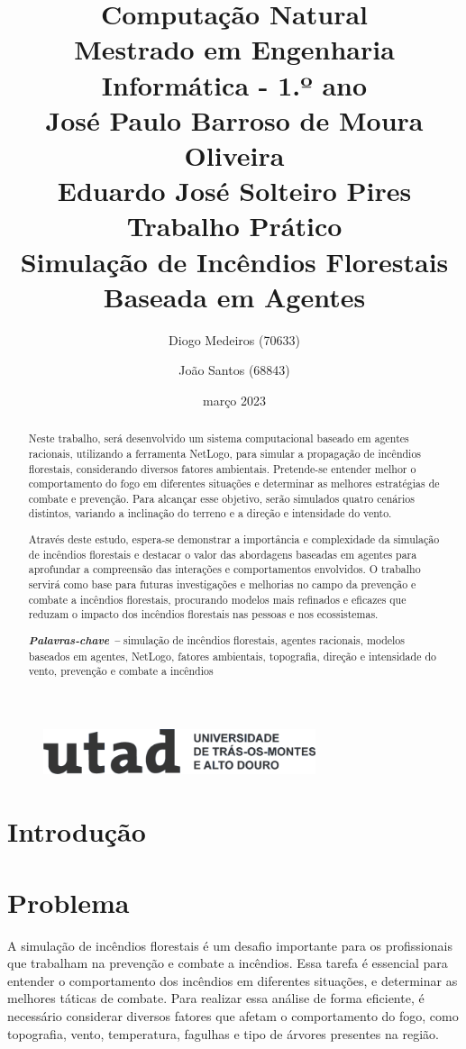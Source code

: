 \documentclass[a4paper, portuguese]{report}
\title{\textbf{Computação Natural}\\ Mestrado em Engenharia Informática - 1.º ano\\ \vspace*{1cm} José Paulo Barroso de Moura Oliveira\\ Eduardo José Solteiro Pires\\ \vspace*{3cm}\textbf{Trabalho Prático}\\ Simulação de Incêndios Florestais Baseada em Agentes \vspace*{1cm}}
\author{Diogo Medeiros (70633) \and João Santos (68843)}
\date{março 2023}
\providecommand{\keywords}[1]
{
    \small
    \textbf{\textit{Palavras-chave --}} #1
}
\begin{document}
    \begin{figure}
        \includegraphics[width=8cm]{images/utad}
        \label{fig:figure}
    \end{figure}

    \maketitle

    \begin{abstract}

        Neste trabalho, será desenvolvido um sistema computacional baseado em agentes racionais, utilizando a ferramenta NetLogo, para simular a propagação de incêndios florestais, considerando diversos fatores ambientais.
        Pretende-se entender melhor o comportamento do fogo em diferentes situações e determinar as melhores estratégias de combate e prevenção.
        Para alcançar esse objetivo, serão simulados quatro cenários distintos, variando a inclinação do terreno e a direção e intensidade do vento.

        Através deste estudo, espera-se demonstrar a importância e complexidade da simulação de incêndios florestais e destacar o valor das abordagens baseadas em agentes para aprofundar a compreensão das interações e comportamentos envolvidos.
        O trabalho servirá como base para futuras investigações e melhorias no campo da prevenção e combate a incêndios florestais, procurando modelos mais refinados e eficazes que reduzam o impacto dos incêndios florestais nas pessoas e nos ecossistemas.

        \keywords{simulação de incêndios florestais, agentes racionais, modelos baseados em agentes, NetLogo, fatores ambientais, topografia, direção e intensidade do vento, prevenção e combate a incêndios}

    \end{abstract}

    \tableofcontents
    \listoffigures
    \listoftables
    \listofalgorithms


    \chapter{Introdução}\label{ch:introduction}
    


    \chapter{Problema}\label{ch:problem}
    A simulação de incêndios florestais é um desafio importante para os profissionais que trabalham na prevenção e combate a incêndios.
    Essa tarefa é essencial para entender o comportamento dos incêndios em diferentes situações, e determinar as melhores táticas de combate.
    Para realizar essa análise de forma eficiente, é necessário considerar diversos fatores que afetam o comportamento do fogo, como topografia, vento, temperatura, fagulhas e tipo de árvores presentes na região.
\end{document}
